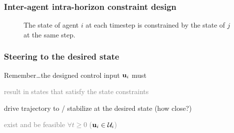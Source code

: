\begin{frame} %
  \frametitle{Inter-agent intra-horizon constraint design}
\begin{figure}[ht!]
  \centering
  
  \caption{The state of agent $i$ at each timestep is constrained by the state
    of $j$ at the same step.
  }
  \label{fig:constraint_regime_horizon}
\end{figure}
\end{frame} %
\begin{frame} %
  \frametitle{Steering to the desired state}

  Remember\dots the designed control input $\bm{\mathbf{u}}_i$ must\\[2ex]

  \begin{wideitemize}
    \item \textcolor{gray}{result in states that satisfy the state constraints} \\[2ex]
    \item drive trajectory to / stabilize at the desired state (how close?) \\[2ex]
    \item \textcolor{gray}{exist and be feasible $\forall t \geq 0$ ($\bm{\mathbf{u}}_i \in \mathcal{U}_i$)} \\[2ex]
  \end{wideitemize}

\end{frame} %
